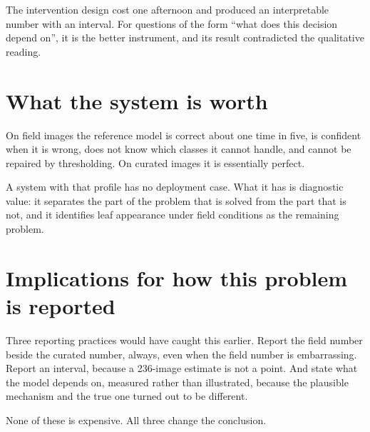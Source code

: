 The intervention design cost one afternoon and produced an interpretable number with
an interval. For questions of the form ``what does this decision depend on'', it is
the better instrument, and its result contradicted the qualitative reading.

\section{What the system is worth}

On field images the reference model is correct about one time in five, is confident
when it is wrong, does not know which classes it cannot handle, and cannot be
repaired by thresholding. On curated images it is essentially perfect.

A system with that profile has no deployment case. What it has is diagnostic value:
it separates the part of the problem that is solved from the part that is not, and it
identifies leaf appearance under field conditions as the remaining problem.

\section{Implications for how this problem is reported}

Three reporting practices would have caught this earlier. Report the field number
beside the curated number, always, even when the field number is embarrassing.
Report an interval, because a 236-image estimate is not a point. And state what the
model depends on, measured rather than illustrated, because the plausible mechanism
and the true one turned out to be different.

None of these is expensive. All three change the conclusion.
